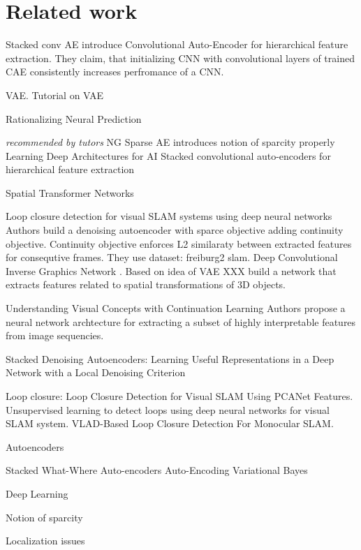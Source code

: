 
\chapter{Related work}
\label{ch:rewo}
Stacked conv AE \cite{Masci2011} introduce Convolutional Auto-Encoder for hierarchical feature extraction.
They claim, that initializing CNN with convolutional layers of trained CAE consistently increases perfromance of a CNN.

VAE. Tutorial on VAE \cite{Doersch2016}

Rationalizing Neural Prediction \cite{Lei2016}


\textit{recommended by tutors}
NG Sparse AE  \cite{Ng2011} introduces notion of sparcity properly
Learning Deep Architectures for AI \cite{Bengio2009}
Stacked convolutional auto-encoders for hierarchical feature extraction \cite{Masci2011}

Spatial Transformer Networks \cite{Jaderberg2015}

Loop closure detection for visual SLAM systems using deep neural networks \cite{Gao2015}
Authors build a denoising autoencoder with sparce objective adding continuity objective.
Continuity objective enforces L2 similaraty between extracted features for consequtive frames. They use dataset: freiburg2 slam.
Deep Convolutional Inverse Graphics Network \cite{Kulkarni2015}.
Based on idea of VAE XXX build a network that extracts features related to spatial transformations of 3D objects.

Understanding Visual Concepts with Continuation Learning \cite{Whitney2016}
Authors propose a neural network archtecture for extracting a subset of highly interpretable features
from image sequencies.

Stacked Denoising Autoencoders: Learning Useful Representations in a Deep Network with a Local Denoising Criterion \cite{Vincent2010}

Loop closure:
Loop Closure Detection for Visual SLAM Using PCANet Features.
Unsupervised learning to detect loops using deep neural networks for visual SLAM system.
VLAD-Based Loop Closure Detection For Monocular SLAM.
\cite{Xia2016, Gao2015a, Huang2016}



Autoencoders

Stacked What-Where Auto-encoders \cite{Zhao2015}
Auto-Encoding Variational Bayes \cite{Kingma2013}

Deep Learning \cite{LeCun2015}

Notion of sparcity


Localization issues
